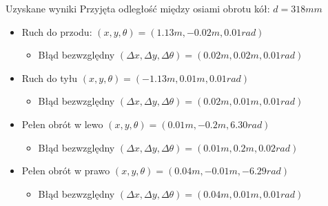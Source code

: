 \documentclass{beamer}
\begin{document}
\begin{frame}{Uzyskane wyniki}
Przyjęta odległość między osiami obrotu kół: $d = 318mm$
\vfill
\begin{itemize}
    \item Ruch do przodu: $(x, y, \theta) = (1.13m, -0.02m, 0.01rad)$
    \begin{itemize}
        \item Błąd bezwzględny $(\Delta x, \Delta y, \Delta \theta) = (0.02m, 0.02m, 0.01rad)$
    \end{itemize}
    
    \item Ruch do tyłu $(x, y, \theta) = (-1.13m, 0.01m, 0.01rad)$
    \begin{itemize}
        \item Błąd bezwzględny $(\Delta x, \Delta y, \Delta \theta) = (0.02m, 0.01m, 0.01rad)$
    \end{itemize}
    
    \item Pełen obrót w lewo $(x, y, \theta) = (0.01m, -0.2m, 6.30rad)$
    \begin{itemize}
        \item Błąd bezwzględny $(\Delta x, \Delta y, \Delta \theta) = (0.01m, 0.2m, 0.02rad)$
    \end{itemize}
    
    \item Pełen obrót w prawo $(x, y, \theta) = (0.04m, -0.01m, -6.29rad)$
    \begin{itemize}
        \item Błąd bezwzględny $(\Delta x, \Delta y, \Delta \theta) = (0.04m, 0.01m, 0.01rad)$
    \end{itemize}
\end{itemize}
    
\end{frame}
\end{document}
